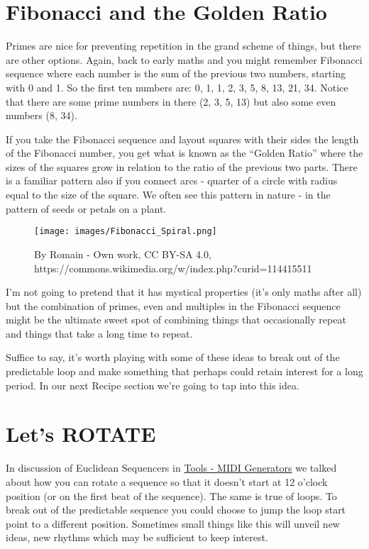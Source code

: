 \documentclass[
  12pt,
  letterpaper,
  oneside,
  open=any]{scrbook}
\begin{document}
\section{Fibonacci and the Golden
Ratio}\label{fibonacci-and-the-golden-ratio}

Primes are nice for preventing repetition in the grand scheme of things,
but there are other options. Again, back to early maths and you might
remember Fibonacci sequence where each number is the sum of the previous
two numbers, starting with 0 and 1. So the first ten numbers are: 0, 1,
1, 2, 3, 5, 8, 13, 21, 34. Notice that there are some prime numbers in
there (2, 3, 5, 13) but also some even numbers (8, 34).

If you take the Fibonacci sequence and layout squares with their sides
the length of the Fibonacci number, you get what is known as the
``Golden Ratio'' where the sizes of the squares grow in relation to the
ratio of the previous two parts. There is a familiar pattern also if you
connect arcs - quarter of a circle with radius equal to the size of the
square. We often see this pattern in nature - in the pattern of seeds or
petals on a plant.

\begin{figure}[H]

{\centering \texttt{[image: images/Fibonacci\_Spiral.png]}

}

\caption{By Romain - Own work, CC BY-SA 4.0,
https://commons.wikimedia.org/w/index.php?curid=114415511}

\end{figure}%

I'm not going to pretend that it has mystical properties (it's only
maths after all) but the combination of primes, even and multiples in
the Fibonacci sequence might be the ultimate sweet spot of combining
things that occasionally repeat and things that take a long time to
repeat.

Suffice to say, it's worth playing with some of these ideas to break out
of the predictable loop and make something that perhaps could retain
interest for a long period. In our next Recipe section we're going to
tap into this idea.

\section{Let's ROTATE}\label{lets-rotate}

In discussion of Euclidean Sequencers in
\hyperref[Chapter-012-Tools-MIDI_Generators]{Tools - MIDI Generators} we
talked about how you can rotate a sequence so that it doesn't start at
12 o'clock position (or on the first beat of the sequence). The same is
true of loops. To break out of the predictable sequence you could choose
to jump the loop start point to a different position. Sometimes small
things like this will unveil new ideas, new rhythms which may be
sufficient to keep interest.
\end{document}
